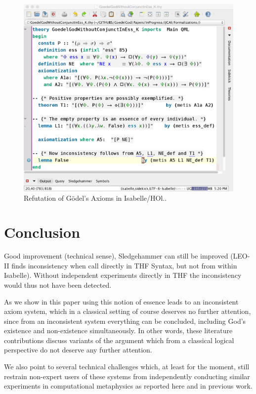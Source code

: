 \documentclass{article}
\begin{document}
\begin{figure}
\centerline{\includegraphics[width=\columnwidth]{./Images/InconsistencyIsabelleK.png}}
\caption{Refutation of G\"odel's Axioms in Isabelle/HOl..} \label{InconsistencyIsabelleK}
\end{figure}





\section{Conclusion}


Good improvement (technical sense), Sledgehammer can still be improved
(LEO-II finds inconsistency when call directly in THF Syntax, but not
from within Isabelle). Without independent experiments directly in THF 
the inconsistency would thus not have been detected.


As we show in this paper using this notion of essence
leads to an inconsistent axiom system, which in a classical setting of
course deserves no further attention, since from an inconsistent
system everything can be concluded, including God's existence and
non-existence simultaneously. In other words, these literature
contributions discuss variants of the argument which from a classical
logical perspective do not deserve any further attention.

We also point to several technical challenges which, at least for the
moment, still restrain non-expert users of these systems from
independently conducting similar experiments in computational
metaphysics as reported here and in previous work.
\end{document}
